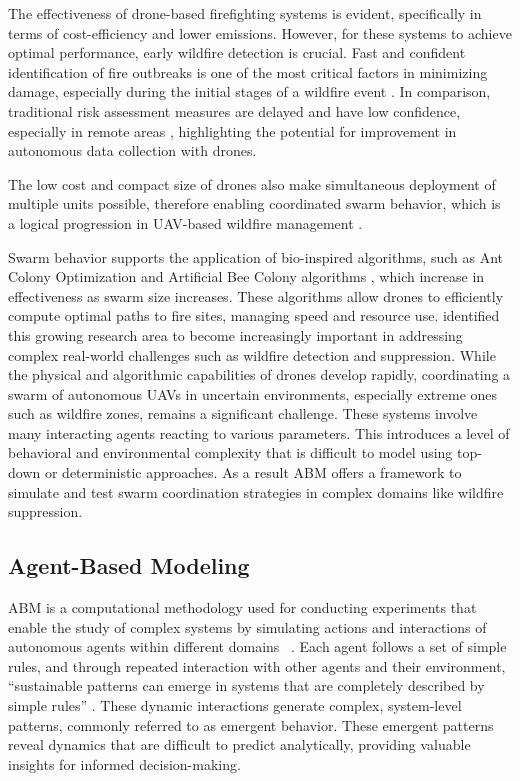 \documentclass[11pt, a4paper]{article}
\begin{document}
The effectiveness of drone-based firefighting systems is evident, specifically in terms of cost-efficiency and lower emissions. However, for these systems to achieve optimal performance, early wildfire detection is crucial. Fast and confident identification of fire outbreaks is one of the most critical factors in minimizing damage, especially during the initial stages of a wildfire event \citep{Sudhakar2020}.
In comparison, traditional risk assessment measures are delayed and have low confidence, especially in remote areas \citep{Afghah2019}, highlighting the potential for improvement in autonomous data collection \citep{Lelis2024} with drones.

The low cost and compact size of drones also make simultaneous deployment of multiple units possible, therefore enabling coordinated swarm behavior, which is a logical progression in UAV-based wildfire management \citep{MetaanalysisHumansystemInterfaces}. 

Swarm behavior supports the application of bio-inspired algorithms, such as Ant Colony Optimization \citep{HybridAntColonyWildfire} and Artificial Bee Colony algorithms \citep{karaboga2007abc}, which increase in effectiveness as swarm size increases. These algorithms allow drones to efficiently compute optimal paths to fire sites, managing speed and resource use. \citet*{MetaanalysisHumansystemInterfaces} identified this growing research area to become increasingly important in addressing complex real-world challenges such as wildfire detection and suppression.
While the physical and algorithmic capabilities of drones develop rapidly, coordinating a swarm of autonomous UAVs in uncertain environments, especially extreme ones such as wildfire zones, remains a significant challenge. These systems involve many interacting agents reacting to various parameters. This introduces a level of behavioral and environmental complexity that is difficult to model using top-down or deterministic approaches. As a result ABM offers a framework to simulate and test swarm coordination strategies in complex domains like wildfire suppression.

\subsection{Agent-Based Modeling}
ABM is a computational methodology used for conducting experiments that enable the study of complex systems by simulating actions and interactions of autonomous agents within different domains  \citep{wilensky2015introduction}. Each agent follows a set of simple rules, and through repeated interaction with other agents and their environment, ``sustainable patterns can emerge in systems that are completely described by simple rules'' \citep[p.5]{intro_to_abm}. These dynamic interactions generate complex, system-level patterns, commonly referred to as emergent behavior. These emergent patterns reveal dynamics that are difficult to predict analytically, providing valuable insights for informed decision-making.
\end{document}
